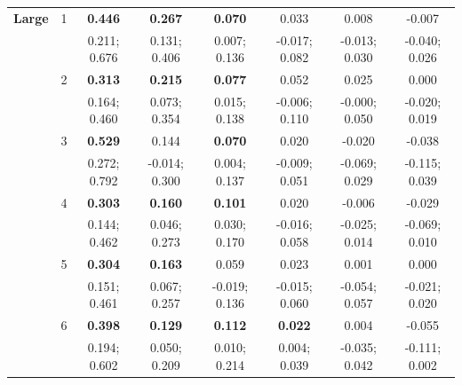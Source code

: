 \begin{table}[!htbp]
\begin{center}
\begin{tabular}{>{\bfseries}cccccccc}
 \midrule
Large & 1 & \bfseries{0.446} & \bfseries{0.267} & \bfseries{0.070} & 0.033 & 0.008 & -0.007 \\ 
 &  & 0.211; 0.676 & 0.131; 0.406 & 0.007; 0.136 & -0.017; 0.082 & -0.013; 0.030 & -0.040; 0.026 \\[1.2ex] 
 & 2 & \bfseries{0.313} & \bfseries{0.215} & \bfseries{0.077} & 0.052 & 0.025 & 0.000 \\ 
 &  & 0.164; 0.460 & 0.073; 0.354 & 0.015; 0.138 & -0.006; 0.110 & -0.000; 0.050 & -0.020; 0.019 \\ [1.2ex]
 & 3 & \bfseries{0.529} & 0.144 & \bfseries{0.070} & 0.020 & -0.020 & -0.038 \\ 
 &  & 0.272; 0.792 & -0.014; 0.300 & 0.004; 0.137 & -0.009; 0.051 & -0.069; 0.029 & -0.115; 0.039 \\ [1.2ex]
 & 4 & \bfseries{0.303} & \bfseries{0.160} & \bfseries{0.101} & 0.020 & -0.006 & -0.029 \\ 
 &  & 0.144; 0.462 & 0.046; 0.273 & 0.030; 0.170 & -0.016; 0.058 & -0.025; 0.014 & -0.069; 0.010 \\ [1.2ex]
 & 5 & \bfseries{0.304} & \bfseries{0.163} & 0.059 & 0.023 & 0.001 & 0.000 \\ 
 &  & 0.151; 0.461 & 0.067; 0.257 & -0.019; 0.136 & -0.015; 0.060 & -0.054; 0.057 & -0.021; 0.020 \\ [1.2ex]
 & 6 & \bfseries{0.398} & \bfseries{0.129} & \bfseries{0.112} & \bfseries{0.022} & 0.004 & -0.055 \\ 
 &  & 0.194; 0.602 & 0.050; 0.209 & 0.010; 0.214 & 0.004; 0.039 & -0.035; 0.042 & -0.111; 0.002 \\ [1.2ex]
\bottomrule
\end{tabular}
\end{center}
\end{table}


